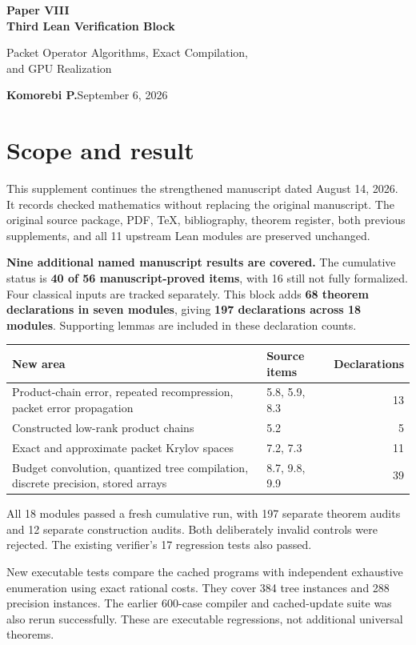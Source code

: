 \documentclass[11pt]{article}
\begin{document}
{\LARGE\bfseries\color{ink} Paper VIII\\[3pt] Third Lean Verification Block}\par
{\large Packet Operator Algorithms, Exact Compilation,\\and GPU Realization}\par
\textbf{Komorebi P.}\hfill September 6, 2026

\section*{\color{ink}Scope and result}
This supplement continues the strengthened manuscript dated August 14, 2026. It records checked mathematics without replacing the original manuscript. The original source package, PDF, TeX, bibliography, theorem register, both previous supplements, and all 11 upstream Lean modules are preserved unchanged.

\textbf{Nine additional named manuscript results are covered.} The cumulative status is \textbf{40 of 56 manuscript-proved items}, with 16 still not fully formalized. Four classical inputs are tracked separately. This block adds \textbf{68 theorem declarations in seven modules}, giving \textbf{197 declarations across 18 modules}. Supporting lemmas are included in these declaration counts.

\begin{center}\small
\renewcommand{\arraystretch}{1.3}
\begin{tabular}{@{}p{}p{}r@{}}
\toprule
New area & Source items & Declarations\\
\midrule
Product-chain error, repeated recompression, packet error propagation & 5.8, 5.9, 8.3 & 13\\
Constructed low-rank product chains & 5.2 & 5\\
Exact and approximate packet Krylov spaces & 7.2, 7.3 & 11\\
Budget convolution, quantized tree compilation, discrete precision, stored arrays & 8.7, 9.8, 9.9 & 39\\
\bottomrule
\end{tabular}
\end{center}

All 18 modules passed a fresh cumulative run, with 197 separate theorem audits and 12 separate construction audits. Both deliberately invalid controls were rejected. The existing verifier's 17 regression tests also passed.

New executable tests compare the cached programs with independent exhaustive enumeration using exact rational costs. They cover 384 tree instances and 288 precision instances. The earlier 600-case compiler and cached-update suite was also rerun successfully. These are executable regressions, not additional universal theorems.
\end{document}
